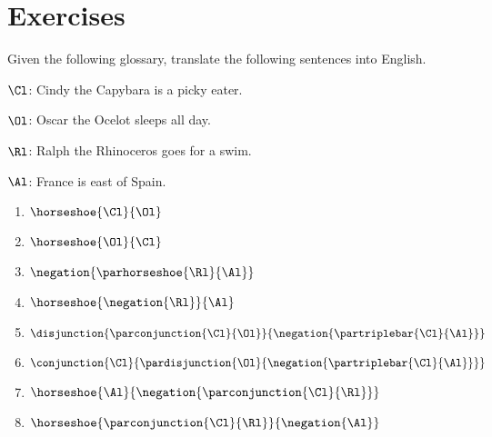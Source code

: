 \section{Exercises}

Given the following glossary, translate the following \GSL{} sentences into English. 
\begin{description}[itemsep=0em]
	\item[Glossary:] \hfill{} 
	\begin{description}[itemsep=0em]
		\item $\Cl$: Cindy the Capybara is a picky eater.
		\item $\Ol$: Oscar the Ocelot sleeps all day.
		\item $\Rl$: Ralph the Rhinoceros goes for a swim.
		\item $\Al$: France is east of Spain. 
	\end{description} 
\end{description}
\begin{multicols}{2}
	\begin{enumerate}
		\item $\horseshoe{\Cl}{\Ol}$
		\item $\horseshoe{\Ol}{\Cl}$
		\item $\negation{\parhorseshoe{\Rl}{\Al}}$
		\item $\horseshoe{\negation{\Rl}}{\Al}$
		\item $\disjunction{\parconjunction{\Cl}{\Ol}}{\negation{\partriplebar{\Cl}{\Al}}}$
		\item $\conjunction{\Cl}{\pardisjunction{\Ol}{\negation{\partriplebar{\Cl}{\Al}}}}$
		\item $\horseshoe{\Al}{\negation{\parconjunction{\Cl}{\Rl}}}$
		\item $\horseshoe{\parconjunction{\Cl}{\Rl}}{\negation{\Al}}$
	\end{enumerate}
\end{multicols}

